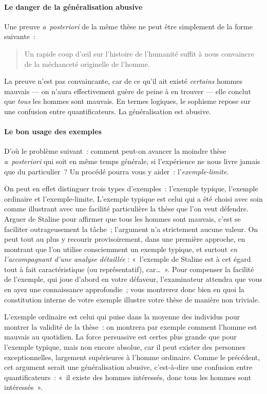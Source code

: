\documentclass[a4paper,12pt]{article}
\begin{document}
\paragraph{Le danger de la généralisation abusive}
\label{sec-3-3-2-2}

Une preuve \emph{a posteriori} de la même thèse ne peut être simplement de la
forme suivante :

\begin{quote}
Un rapide coup d'œil sur l'histoire de l'humanité suffit à nous
convaincre de la méchanceté originelle de l'homme.
\end{quote}

La preuve n'est pas convaincante, car de ce qu'il ait existé
\emph{certains} hommes mauvais --- on n'aura effectivement guère de peine
à en trouver --- elle conclut que \emph{tous} les hommes sont mauvais. En
termes logiques, le sophisme repose sur une confusion entre
quantificateurs. La généralisation est abusive.

\paragraph{Le bon usage des exemples}
\label{sec-3-3-2-3}

D'où le problème suivant : comment peut-on avancer la moindre thèse
\emph{a posteriori} qui soit en même temps générale, si l'expérience ne
nous livre jamais que du particulier ? Un procédé pourra vous y
aider : l'\emph{exemple-limite}.

On peut en effet distinguer trois types d'exemples : l'exemple
typique, l'exemple ordinaire et l'exemple-limite. L'exemple typique
est celui qui a été choisi avec soin comme illustrant avec une
facilité particulière la thèse que l'on veut défendre. Arguer de
Staline pour affirmer que tous les hommes sont mauvais, c'est se
faciliter outrageusement la tâche ; l'argument n'a strictement aucune
valeur. On peut tout au plus y recourir provisoirement, dans une
première approche, en montrant que l'on utilise consciemment un
exemple typique, et surtout \emph{en l'accompagnant d'une analyse
détaillée} : « l'exemple de Staline est à cet égard tout à fait
caractéristique (ou représentatif), car\ldots{} ». Pour compenser la
facilité de l'exemple, qui joue d'abord en votre défaveur,
l'examinateur attendra que vous en ayez une connaissance
approfondie ; vous montrerez donc bien en quoi la constitution
interne de votre exemple illustre votre thèse de manière non
triviale.

L'exemple ordinaire est celui qui puise dans la moyenne des individus
pour montrer la validité de la thèse : on montrera par exemple
comment l'homme est mauvais au quotidien. La force persuasive est
certes plus grande que pour l'exemple typique, mais non encore
absolue, car il peut exister des personnes exceptionnelles, largement
supérieures à l'homme ordinaire. Comme le précédent, cet argument
serait une généralisation abusive, c'est-à-dire une confusion entre
quantificateurs : « il existe des hommes intéressés, donc tous les
hommes sont intéressés ».
\end{document}
